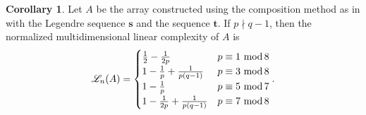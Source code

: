 \documentclass[12pt]{article}
\renewcommand{\mod}{\ \textup{mod}\,}
\theoremstyle{definition}
\theoremstyle{definition}
\theoremstyle{definition}
\newtheorem{cor}[theorem]{Corollary}
\theoremstyle{plain}
\theoremstyle{plain}
\numberwithin{equation}{section}
\begin{document}
\begin{cor}
    Let $A$ be the array constructed using the composition method as in  with the Legendre sequence $\mathbf{s}$ and the sequence $\mathbf{t}$. 
    If $p \nmid q-1$, then the normalized multidimensional linear complexity of $A$ is
    \[
    \mathscr{L}_n(A) = \begin{cases}
        \frac{1}{2}-\frac{1}{2p} & p\equiv 1 \mod 8\\
        1-\frac{1}{p} + \frac{1}{p(q-1)} & p \equiv 3\mod 8\\
        1-\frac{1}{p} & p \equiv 5 \mod 7\\
        1-\frac{1}{2p} + \frac{1}{p(q-1)} & p \equiv 7 \mod 8
    \end{cases}.
    \]
\end{cor}
\end{document}
